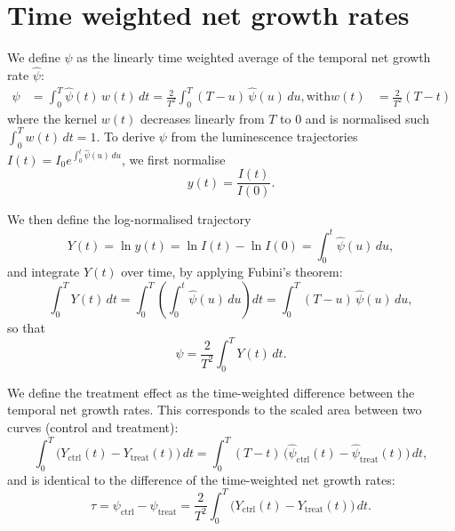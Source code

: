 \section{Time weighted net growth rates}\label{ssec:netgrowth}
We define $\psi$ as the linearly time weighted average of the temporal net growth rate $\hat{\psi}$:
\begin{align}
  \psi &=  \int_{0}^{T} \hat{\psi}(t)\,w(t)\,dt =
  \frac{2}{T^{2}} \int_{0}^{T} (T - u)\, \hat{\psi}(u)\, du,
  \text{with}
  w(t) &=\frac{2}{T^{2}}(T-t)
  \label{eq:psi_weighted}
\end{align}
where  the kernel \(w(t)\) decreases linearly from \(T\) to \(0\) and is normalised such \(\int_0^T w(t)\,dt=1\).
To derive \(\psi\) from the luminescence trajectories \(I(t) = I_0 e^{\int_{0}^{t}\hat{\psi}(u)\,du}\), we first normalise
\begin{equation}
  y(t)=\frac{I(t)}{I(0)}.
  \label{eq:norm}
\end{equation}

We then define the log-normalised trajectory
\begin{equation}
  Y(t)=\ln y(t)=\ln I(t)-\ln I(0)=\int_{0}^{t}\hat{\psi}(u)\,du,
  \label{eq:Ydef}
\end{equation}
and integrate \(Y(t)\) over time, by applying Fubini's theorem:
\begin{equation}
  \int_{0}^{T} Y(t)\, dt =
  \int_{0}^{T} \left( \int_{0}^{t} \hat{\psi}(u)\, du \right) dt
  =    \int_{0}^{T} (T - u)\, \hat{\psi}(u)\, du,
  \label{eq:intY}
\end{equation}
so that
\begin{equation}
  \psi=\frac{2}{T^{2}}\int_{0}^{T}Y(t)\,dt.
  \label{eq:psi_eff}
\end{equation}

We define the treatment effect as the  time-weighted difference between the temporal net growth rates.
This corresponds to the scaled area between two curves (control and treatment):
\begin{equation}
  \int_{0}^{T}\!\big(Y_{\mathrm{ctrl}}(t)-Y_{\mathrm{treat}}(t)\big)\,dt    =
  \int_{0}^{T}\!(T-t)\,\big(\hat{\psi}_{\mathrm{ctrl}}(t)-\hat{\psi}_{\mathrm{treat}}(t)\big)\,dt,
  \label{eq:intYdiff}
\end{equation}
and is identical to the difference of the time-weighted net growth rates:
\begin{equation}
  \tau =
  \psi_{\mathrm{ctrl}}-\psi_{\mathrm{treat}}
  = \frac{2}{T^{2}}\int_{0}^{T}\!\big(Y_{\mathrm{ctrl}}(t)-Y_{\mathrm{treat}}(t)\big)\,dt.
  \label{eq:tau_eff}
\end{equation}

